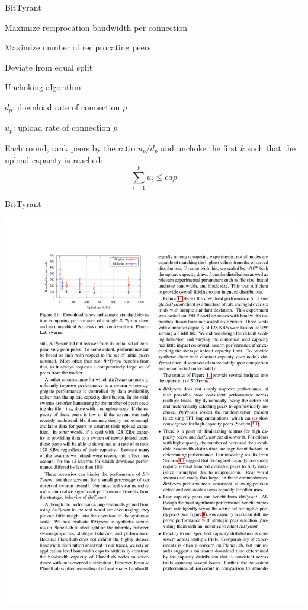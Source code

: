 \begin{frame}{BitTyrant}

\BI
\item Maximize reciprocation bandwidth per connection
\item Maximize number of reciprocating peers
\item Deviate from equal split
\EI

\smallskip
\begin{block}{Unchoking algorithm}
\BI
\item $d_p$: download rate of connection $p$
\item $u_p$: upload rate of connection $p$
\item Each round, rank peers by the ratio $u_p/d_p$ and unchoke the first
$k$ such that the upload capacity is reached:
\[
\sum_{i=1}^k u_i \leq \mathit{cap}
\]
\EI
\end{block}
\end{frame}

\begin{frame}{BitTyrant}

\includegraphics[width=\textwidth]{figs/10/bittyrant1}

\end{frame}

